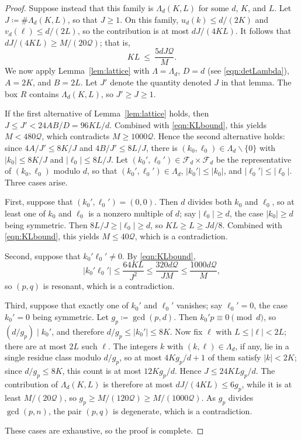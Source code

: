 \documentclass[10pt,a4paper]{amsart}
\begin{document}
\begin{proof}
Suppose instead that this family is $\Lambda_d(K,L)$ for some $d$, $K$, and $L$.  Let $J\coloneq \#\Lambda_d(K,L)$, so that $J\ge1$.  On this family, $u_d(k)\le d/(2K)$ and $v_d(\ell)\le d/(2L)$, so the contribution is at most $dJ/(4KL)$.  It follows that $dJ/(4KL)\ge M/(20 \mathcal{Q})$; that is,
\begin{equation}
\label{eqn:KLbound}
KL\ \le\ \frac{5 d J \mathcal{Q}}{M}.
\end{equation}
We now apply Lemma~\ref{lem:lattice} with $\Lambda=\Lambda_d$, $D=d$ (see \eqref{eqn:detLambda}), $A=2K$, and $B=2L$.  Let $J'$ denote the quantity denoted $J$ in that lemma.  The box $R$ contains $\Lambda_d(K,L)$, so $J'\ge J\ge1$.

If the first alternative of Lemma~\ref{lem:lattice} holds, then $J\le J'<24AB/D=96KL/d$.  Combined with \eqref{eqn:KLbound}, this yields $M<480 \mathcal{Q}$, which contradicts $M\ge1000 \mathcal{Q}$.  Hence the second alternative holds: since $4A/J'\le8K/J$ and $4B/J'\le8L/J$, there is $(k_0,\ell_0)\in\Lambda_d\smallsetminus\{0\}$ with $|k_0|\le8K/J$ and $|\ell_0|\le8L/J$.  Let $(k_0',\ell_0')\in\mathcal{F}_d\times\mathcal{F}_d$ be the representative of $(k_0,\ell_0)$ modulo $d$, so that $(k_0',\ell_0')\in\Lambda_d$, $|k_0'|\le|k_0|$, and $|\ell_0'|\le|\ell_0|$.  Three cases arise.

First, suppose that $(k_0',\ell_0')=(0,0)$.  Then $d$ divides both $k_0$ and $\ell_0$, so at least one of $k_0$ and $\ell_0$ is a nonzero multiple of $d$; say $|\ell_0|\ge d$, the case $|k_0|\ge d$ being symmetric.  Then $8L/J\ge|\ell_0|\ge d$, so $KL\ge L\ge Jd/8$.  Combined with \eqref{eqn:KLbound}, this yields $M\le40 \mathcal{Q}$, which is a contradiction.

Second, suppose that $k_0'\ell_0'\ne0$.  By \eqref{eqn:KLbound},
\[
|k_0'\ell_0'|\le\frac{64 KL}{J^2}\le\frac{320 d \mathcal{Q}}{J M}\le\frac{1000 d \mathcal{Q}}{M},
\]
so $(p,q)$ is resonant, which is a contradiction.

Third, suppose that exactly one of $k_0'$ and $\ell_0'$ vanishes; say $\ell_0'=0$, the case $k_0'=0$ being symmetric.  Let $g_p\coloneq \gcd(p,d)$.  Then $k_0'p\equiv0\pmod d$, so $(d/g_p)\mid k_0'$, and therefore $d/g_p\le|k_0'|\le8K$.  Now fix $\ell$ with $L\le|\ell|<2L$; there are at most $2L$ such $\ell$.  The integers $k$ with $(k,\ell)\in\Lambda_d$, if any, lie in a single residue class modulo $d/g_p$, so at most $4Kg_p/d+1$ of them satisfy $|k|<2K$; since $d/g_p\le8K$, this count is at most $12Kg_p/d$.  Hence $J\le24KLg_p/d$.  The contribution of $\Lambda_d(K,L)$ is therefore at most $dJ/(4KL)\le6g_p$, while it is at least $M/(20 \mathcal{Q})$, so $g_p\ge M/(120 \mathcal{Q})\ge M/(1000 \mathcal{Q})$.  As $g_p$ divides $\gcd(p,n)$, the pair $(p,q)$ is degenerate, which is a contradiction.

These cases are exhaustive, so the proof is complete.
\end{proof}
\end{document}
